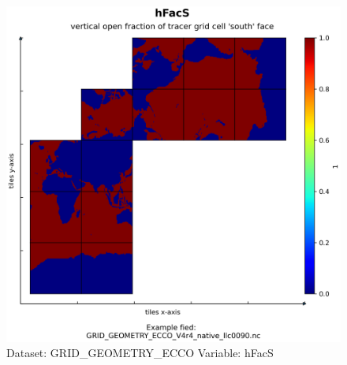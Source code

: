 \begin{figure}[H]
\centering
\includegraphics[width=\textwidth]{../images/plots/native_plots_coords/Geometry_Parameters_for_the_Lat-Lon-Cap_90_(llc90)_Native_Model_Grid_(Version_4_Release_4)/hFacS.png}
\caption{Dataset: GRID\_GEOMETRY\_ECCO Variable: hFacS}
\label{tab:table-GRID_GEOMETRY_ECCO_hFacS-Plot}
\end{figure}
\pagebreak
